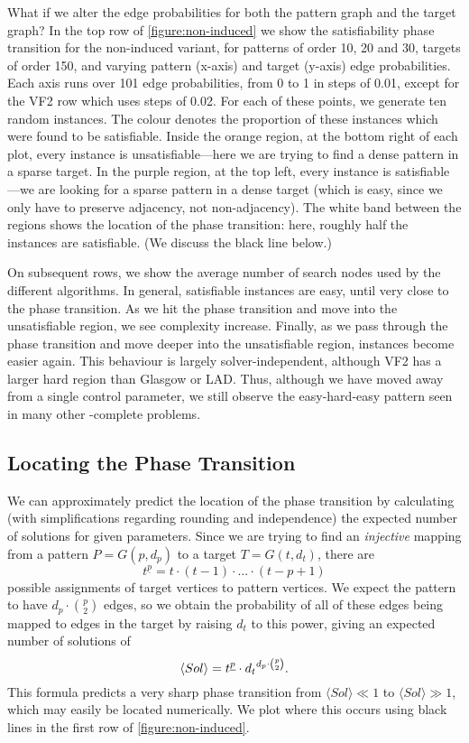 \documentclass[letterpaper]{article}
\begin{document}
What if we alter the edge probabilities for both the pattern graph and the target graph?  In the top
row of \cref{figure:non-induced} we show the satisfiability phase transition for the non-induced
variant, for patterns of order 10, 20 and 30, targets of order 150, and varying pattern (x-axis) and
target (y-axis) edge probabilities. Each axis runs over 101 edge probabilities, from 0 to 1 in steps
of 0.01, except for the VF2 row which uses steps of 0.02. For each of these points, we generate ten
random instances. The colour denotes the proportion of these instances which were found to be
satisfiable.  Inside the orange region, at the bottom right of each plot, every instance is
unsatisfiable---here we are trying to find a dense pattern in a sparse target. In the purple region,
at the top left, every instance is satisfiable---we are looking for a sparse pattern in a dense
target (which is easy, since we only have to preserve adjacency, not non-adjacency). The white band
between the regions shows the location of the phase transition: here, roughly half the instances are
satisfiable. (We discuss the black line below.)

On subsequent rows, we show the average number of search nodes used by the different algorithms. In
general, satisfiable instances are easy, until very close to the phase transition. As we hit the
phase transition and move into the unsatisfiable region, we see complexity increase. Finally, as
we pass through the phase transition and move deeper into the unsatisfiable region, instances become
easier again. This behaviour is largely solver-independent, although VF2 has a larger hard region
than Glasgow or LAD. Thus, although we have moved away from a single control parameter, we still
observe the easy-hard-easy pattern seen in many other \NP-complete problems.

\subsection{Locating the Phase Transition}

We can approximately predict the location of the phase transition by calculating (with
simplifications regarding rounding and independence) the expected number of solutions for given
parameters. Since we are trying to find an \emph{injective} mapping from a pattern $P = G(p, d_p)$
to a target $T = G(t, d_t)$, there are \[ t^{\underline{p}} = t \cdot (t - 1) \cdot \ldots \cdot (t -
p + 1) \] possible assignments of target vertices to pattern vertices.  We expect the pattern to have
$d_p \cdot \binom{p}{2}$ edges, so we obtain the probability of all of these edges being mapped to
edges in the target by raising $d_t$ to this power, giving an expected number of solutions of \[
\langle Sol \rangle = t^{\underline{p}} \cdot {d_t}^{d_p \cdot \binom{p}{2}} \textnormal{.} \] This
formula predicts a very sharp phase transition from $\langle Sol \rangle \ll 1$ to $\langle Sol
\rangle \gg 1$, which may easily be located numerically. We plot where this occurs using black lines
in the first row of \cref{figure:non-induced}.
\end{document}
